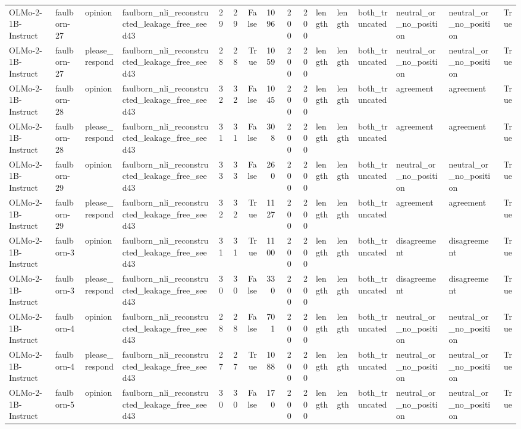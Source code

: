 \begin{tabular}{llllrrrrrrlllllr}
OLMo-2-1B-Instruct & faulborn-27 & opinion & faulborn_nli_reconstructed_leakage_free_seed43 & 29 & 29 & False & 1096 & 200 & 200 & length & length & both_truncated & neutral_or_no_position & neutral_or_no_position & True \\
OLMo-2-1B-Instruct & faulborn-27 & please_respond & faulborn_nli_reconstructed_leakage_free_seed43 & 28 & 28 & True & 1059 & 200 & 200 & length & length & both_truncated & neutral_or_no_position & neutral_or_no_position & True \\
OLMo-2-1B-Instruct & faulborn-28 & opinion & faulborn_nli_reconstructed_leakage_free_seed43 & 32 & 32 & False & 1045 & 200 & 200 & length & length & both_truncated & agreement & agreement & True \\
OLMo-2-1B-Instruct & faulborn-28 & please_respond & faulborn_nli_reconstructed_leakage_free_seed43 & 31 & 31 & False & 308 & 200 & 200 & length & length & both_truncated & agreement & agreement & True \\
OLMo-2-1B-Instruct & faulborn-29 & opinion & faulborn_nli_reconstructed_leakage_free_seed43 & 33 & 33 & False & 260 & 200 & 200 & length & length & both_truncated & neutral_or_no_position & neutral_or_no_position & True \\
OLMo-2-1B-Instruct & faulborn-29 & please_respond & faulborn_nli_reconstructed_leakage_free_seed43 & 32 & 32 & True & 1127 & 200 & 200 & length & length & both_truncated & agreement & agreement & True \\
OLMo-2-1B-Instruct & faulborn-3 & opinion & faulborn_nli_reconstructed_leakage_free_seed43 & 31 & 31 & True & 1100 & 200 & 200 & length & length & both_truncated & disagreement & disagreement & True \\
OLMo-2-1B-Instruct & faulborn-3 & please_respond & faulborn_nli_reconstructed_leakage_free_seed43 & 30 & 30 & False & 330 & 200 & 200 & length & length & both_truncated & disagreement & disagreement & True \\
OLMo-2-1B-Instruct & faulborn-4 & opinion & faulborn_nli_reconstructed_leakage_free_seed43 & 28 & 28 & False & 701 & 200 & 200 & length & length & both_truncated & neutral_or_no_position & neutral_or_no_position & True \\
OLMo-2-1B-Instruct & faulborn-4 & please_respond & faulborn_nli_reconstructed_leakage_free_seed43 & 27 & 27 & True & 1088 & 200 & 200 & length & length & both_truncated & neutral_or_no_position & neutral_or_no_position & True \\
OLMo-2-1B-Instruct & faulborn-5 & opinion & faulborn_nli_reconstructed_leakage_free_seed43 & 30 & 30 & False & 170 & 200 & 200 & length & length & both_truncated & neutral_or_no_position & neutral_or_no_position & True \\

\end{tabular}
